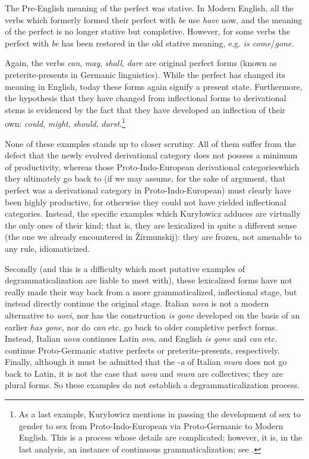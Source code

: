 The Pre-English meaning of the perfect was stative. In Modern English, all the verbs which formerly formed their perfect with \textit{be} use \textit{have} now, and the meaning of the perfect is no longer stative but completive. However, for some verbs the perfect with \textit{be} has been restored in the old stative meaning, e.g. \enlargethispage{\baselineskip} \textit{is come}/\textit{gone}.

Again, the verbs \textit{can}, \textit{may}, \textit{shall}, \textit{dare} are original perfect forms (known as preterite-presents in Germanic linguistics). While the perfect has changed its meaning in English, today these forms again signify a present state. Furthermore, the hypothesis that they have changed from inflectional forms to derivational stems is evidenced by the fact that they have developed an inflection of their own: \textit{could}, \textit{might}, \textit{should}, \textit{durst}.\footnote{As a last example, Kuryłowicz mentions in passing the development of sex to gender to sex from Proto-Indo-European via Proto-Germanic to Modern English. This is a process whose details are complicated; however, it is, in the last analysis, an instance of continuous grammaticalization; see \citet[§7.2]{Lehmann1982b}.}

None of these examples stands up to closer scrutiny. All of them suffer from the defect that the newly evolved derivational category does not possess a minimum of productivity, whereas those Proto-Indo-European derivational categories\linebreak which they ultimately go back to (if we may assume, for the sake of argument, that perfect was a derivational category in Proto-Indo-European) must clearly have been highly productive, for otherwise they could not have yielded inflectional categories. Instead, the specific examples which Kuryłowicz adduces are virtually the only ones of their kind; that is, they are lexicalized in quite a different sense (the one we already encountered in Žirmunskij): they are frozen, not amenable to any rule, idiomaticized.

Secondly (and this is a difficulty which most putative examples of degrammaticalization are liable to meet with), these lexicalized forms have not really made their way back from a more grammaticalized, inflectional stage, but instead directly continue the original stage. Italian \textit{uova} is not a modern alternative to \textit{uovi}, nor has the construction \textit{is gone} developed on the basis of an earlier \textit{has gone}, nor do \textit{can} etc. go back to older completive perfect forms. Instead, Italian \textit{uova} continues Latin \textit{ova}, and English \textit{is gone} and \textit{can} etc. continue Proto-Germanic stative perfects or preterite-presents, respectively. Finally, although it must be admitted that the -\textit{a} of Italian \textit{mura} does not go back to Latin, it is not the case that \textit{uova} and \textit{mura} are collectives; they are plural forms. So these examples do not establish a degrammaticalization process.

